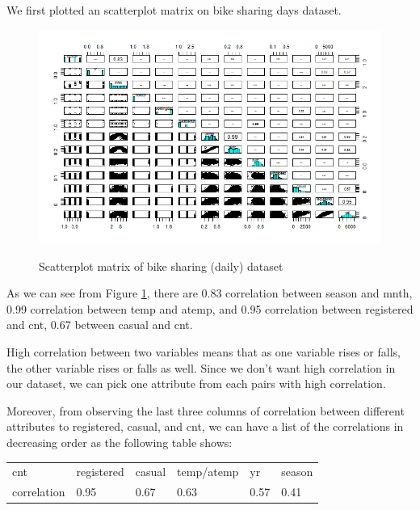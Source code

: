 \documentclass[12pt]{article}
\begin{document}
	We first plotted an scatterplot matrix on bike sharing days dataset.
	\begin{figure}[H]
		\includegraphics[scale=0.6]{figures/scatterplot.png}
		\label{fig:scatterplot}
		\caption{Scatterplot matrix of bike sharing (daily) dataset}
	\end{figure}
	
	As we can see from Figure \ref{fig:scatterplot}, there are 0.83 correlation between season and mnth, 0.99 correlation between temp and atemp, and 0.95 correlation between registered and cnt, 0.67 between casual and cnt.
	
	High correlation between two variables means that as one variable rises or falls, the other variable rises or falls as well. Since we don't want high correlation in our dataset, we can pick one attribute from each pairs with high correlation.
	
	Moreover, from observing the last three columns of correlation between different attributes to registered, casual, and cnt, we can have a list of the correlations in decreasing order as the following table shows: 
	\begin{table}[H]
		\begin{tabular}{| l | l | l | l | l | l|}
			cnt~ & registered & casual & temp/atemp & yr & season\\
			correlation & 0.95 & 0.67 & 0.63 & 0.57 & 0.41\\
			\hline
		\end{tabular}
	\end{table}
	
\end{document}
